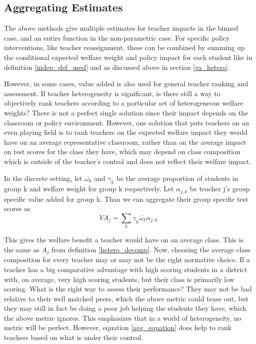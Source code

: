 \documentclass[12pt]{article}
\theoremstyle{definition}
\theoremstyle{definition}
\theoremstyle{definition}
\theoremstyle{definition}
\begin{document}
        \subsection{Aggregating Estimates}
        The above methods give multiple estimates for teacher impacts in the binned case, and an entire function in the non-parametric case. For specific policy interventions, like teacher reassignment, these can be combined by summing up the conditional expected welfare weight and policy impact for each student like in definition \ref{indep_def_used} and as discussed above in section \ref{va_hetero}. 

        However, in some cases,  value added is also used for general teacher ranking and assessment. If teacher heterogeneity is significant, is there still a way to objectively rank teachers according to a particular set of heterogeneous welfare weights? There is not a perfect single solution since their impact depends on the classroom or policy environment. However, one solution that puts teachers on an even playing field is to rank teachers on the expected welfare impact they would have on an average representative classroom, rather than on the average impact on test scores for the class they have, which may depend on class composition which is outside of the teacher's control and does not reflect their welfare impact.
        
        
        In the discrete setting, let $\bar{\omega_k}$ and $\gamma_k$ be the average proportion of students in group k and welfare weight for group k respectively. Let $\alpha_{j,k}$ be teacher j's group specific value added for group k. Than we can aggregate their group specific test scores as 
        \begin{equation}
        \label{agg_equation}
            VA_j = \sum_k \gamma_k \bar{\omega_k} \alpha_{j,k}
        \end{equation}
        
        This gives the welfare benefit a teacher would have on an average class. This is the same as $A_j$ from definition \ref{hetero_decomp}. Now, choosing the average class composition for every teacher may or may not be the right normative choice. If a teacher has a big comparative advantage with high scoring students in a district with, on average, very high scoring students, but their class is primarily low scoring. What is the right way to assess their performance? They may not be bad relative to their well matched peers, which the above metric could tease out, but they may still in fact be doing a poor job helping the students they have, which the above metric ignores. This emphasizes that in a world of heterogeneity, no metric will be perfect. However, equation \ref{agg_equation} does help to rank teachers based on what is under their control. 
        
\end{document}
